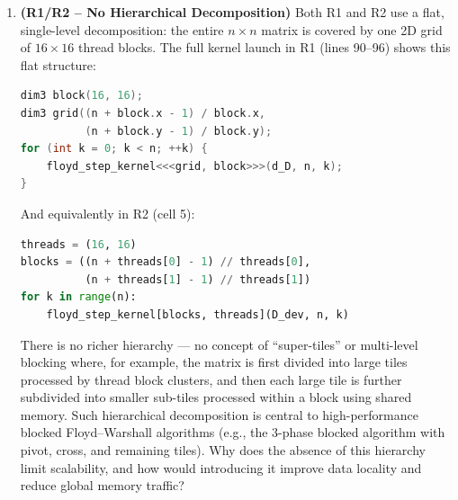 \documentclass[11pt]{article}
\begin{document}
\begin{enumerate}
  In R1 (lines 94--96 of \texttt{floyd\_warshall\_cuda}):
\begin{lstlisting}[language=C++]
for (int k = 0; k < n; ++k) {
    floyd_step_kernel<<<grid, block>>>(d_D, n, k);
}
cudaDeviceSynchronize();
\end{lstlisting}

  In R2 (cell 5, \texttt{floyd\_warshall\_numba\_cuda}):
\begin{lstlisting}[language=Python]
for k in range(n):
    floyd_step_kernel[blocks, threads](D_dev, n, k)
cuda.synchronize()
\end{lstlisting}

  For large $n$ (say 2048), that is 2048 kernel launches, each with a small but non-zero cost. Could multiple $k$-steps be batched or fused into a single kernel (where safe) to reduce this repeated launch and synchronization overhead? What constraints does the data dependency on $k$ impose on such batching?

  \item \textbf{(R1/R2 -- No Hierarchical Decomposition)} Both R1 and R2 use a flat, single-level decomposition: the entire $n \times n$ matrix is covered by one 2D grid of $16 \times 16$ thread blocks. The full kernel launch in R1 (lines 90--96) shows this flat structure:
\begin{lstlisting}[language=C++]
dim3 block(16, 16);
dim3 grid((n + block.x - 1) / block.x,
          (n + block.y - 1) / block.y);
for (int k = 0; k < n; ++k) {
    floyd_step_kernel<<<grid, block>>>(d_D, n, k);
}
\end{lstlisting}

  And equivalently in R2 (cell 5):
\begin{lstlisting}[language=Python]
threads = (16, 16)
blocks = ((n + threads[0] - 1) // threads[0],
          (n + threads[1] - 1) // threads[1])
for k in range(n):
    floyd_step_kernel[blocks, threads](D_dev, n, k)
\end{lstlisting}

  There is no richer hierarchy --- no concept of ``super-tiles'' or multi-level blocking where, for example, the matrix is first divided into large tiles processed by thread block clusters, and then each large tile is further subdivided into smaller sub-tiles processed within a block using shared memory. Such hierarchical decomposition is central to high-performance blocked Floyd--Warshall algorithms (e.g., the 3-phase blocked algorithm with pivot, cross, and remaining tiles). Why does the absence of this hierarchy limit scalability, and how would introducing it improve data locality and reduce global memory traffic?
\end{enumerate}
\end{document}
